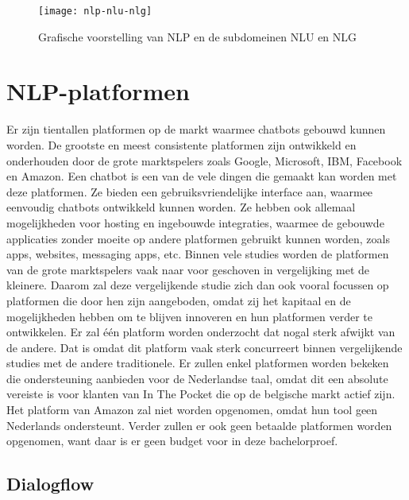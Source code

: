 \begin{figure}[!htbp]
    \label{fig:nlp-nlu-nlg}
    \centering
    \texttt{[image: nlp-nlu-nlg]}
    \caption{Grafische voorstelling van NLP en de subdomeinen NLU en NLG \autocite{Sciforce2019}}
\end{figure}

\section{NLP-platformen}
\label{sec:nlp-platformen}

Er zijn tientallen platformen op de markt waarmee chatbots gebouwd kunnen worden. De grootste en meest consistente platformen zijn ontwikkeld en onderhouden door de grote marktspelers zoals Google, Microsoft, IBM, Facebook en Amazon. Een chatbot is een van de vele dingen die gemaakt kan worden met deze platformen. Ze bieden een gebruiksvriendelijke interface aan, waarmee eenvoudig chatbots ontwikkeld kunnen worden. Ze hebben ook allemaal mogelijkheden voor hosting en ingebouwde integraties, waarmee de gebouwde applicaties zonder moeite op andere platformen gebruikt kunnen worden, zoals apps, websites, messaging apps, etc. Binnen vele studies worden de platformen van de grote marktspelers vaak naar voor geschoven in vergelijking met de kleinere. Daarom zal deze vergelijkende studie zich dan ook vooral focussen op platformen die door hen zijn aangeboden, omdat zij het kapitaal en de mogelijkheden hebben om te blijven innoveren en hun platformen verder te ontwikkelen. Er zal één platform worden onderzocht dat nogal sterk afwijkt van de andere. Dat is omdat dit platform vaak sterk concurreert binnen vergelijkende studies met de andere traditionele. Er zullen enkel platformen worden bekeken die ondersteuning aanbieden voor de Nederlandse taal, omdat dit een absolute vereiste is voor klanten van In The Pocket die op de belgische markt actief zijn. Het platform van Amazon zal niet worden opgenomen, omdat hun tool geen Nederlands ondersteunt. Verder zullen er ook geen betaalde platformen worden opgenomen, want daar is er geen budget voor in deze bachelorproef.

\subsection{Dialogflow}
\label{subsec:nlp-platformen-dialogflow}

